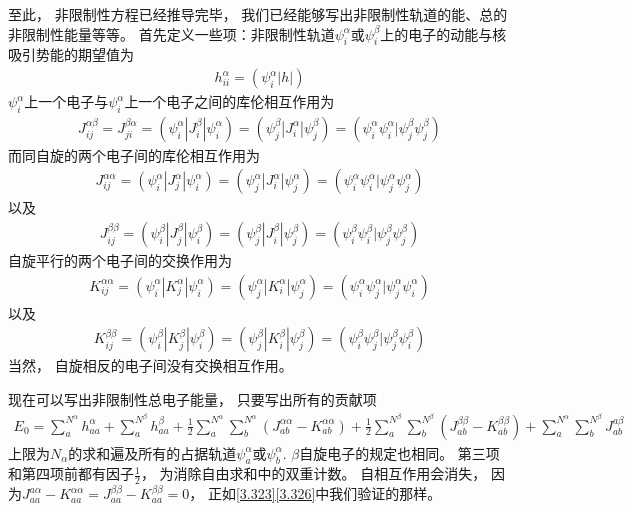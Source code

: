 至此，
非限制性\hft 方程已经推导完毕，
我们已经能够写出非限制性轨道的能、总的非限制性能量等等。
首先定义一些项：非限制性轨道$\psi_i^\alpha$或$\psi_i^\beta$上的电子的动能与核吸引势能的期望值为
\begin{align}\label{3.321}
	h_{ii}^\alpha = (\psi_i^\alpha|h|)
\end{align}
$\psi_i^\alpha$上一个电子与$\psi_i^\alpha$上一个电子之间的库伦相互作用为
\begin{align}\label{3.322}
	J_{ij}^{\alpha\beta} = J_{ji}^{\beta\alpha} = (\psi_i^\alpha|J_{i}^\beta|\psi_i^\alpha) = (\psi_j^\beta|J_{i}^\alpha|\psi_j^\beta) = (\psi_i^\alpha\psi_i^\alpha|\psi_j^\beta\psi_j^\beta)
\end{align}
而同自旋的两个电子间的库伦相互作用为
\begin{align}\label{3.323}
	J_{i j}^{\alpha \alpha}=(\psi_{i}^{\alpha}|J_{j}^{\alpha}| \psi_{i}^{\alpha})=(\psi_{j}^{\alpha}|J_{i}^{\alpha}| \psi_{j}^{\alpha})=(\psi_{i}^{\alpha} \psi_{i}^{\alpha} | \psi_{j}^{\alpha} \psi_{j}^{\alpha})
\end{align}
以及
\begin{align}\label{3.324}
	J_{i j}^{\beta \beta}=(\psi_{i}^{\beta}|J_{j}^{\beta}| \psi_{i}^{\beta})=(\psi_{j}^{\beta}|J_{i}^{\beta}| \psi_{j}^{\beta})=(\psi_{i}^{\beta} \psi_{i}^{\beta} | \psi_{j}^{\beta} \psi_{j}^{\beta})
\end{align}
自旋平行的两个电子间的交换作用为
\begin{align}\label{3.325}
	K_{i j}^{\alpha\alpha}=(\psi_{i}^{\alpha}|K_{j}^{\alpha}| \psi_{i}^{\alpha})=(\psi_{j}^{\alpha}|K_{i}^{\alpha}| \psi_{j}^{\alpha})=(\psi_{i}^{\alpha} \psi_{j}^{\alpha} | \psi_{j}^{\alpha} \psi_{i}^{\alpha})
\end{align}
以及
\begin{align}\label{3.326}
	K_{i j}^{\beta\beta}=(\psi_{i}^{\beta}|K_{j}^{\beta}| \psi_{i}^{\beta})=(\psi_{j}^{\beta}|K_{i}^{\beta}| \psi_{j}^{\beta})=(\psi_{i}^{\beta} \psi_{j}^{\beta} | \psi_{j}^{\beta} \psi_{i}^{\beta})
\end{align}
当然，
自旋相反的电子间没有交换相互作用。


现在可以写出非限制性总电子能量，
只要写出所有的贡献项
\begin{align}
	E_{0}=\sum_{a}^{N^{\alpha}} h_{a a}^{\alpha}+\sum_{a}^{N^{\beta}} h_{a a}^{\beta}+\frac{1}{2} \sum_{a}^{N^{\alpha}} \sum_{b}^{N^{\alpha}}\left(J_{a b}^{\alpha \alpha}-K_{a b}^{\alpha \alpha}\right)+\frac{1}{2} \sum_{a}^{N^{\beta}} \sum_{b}^{N^{\beta}}\left(J_{a b}^{\beta \beta}-K_{a b}^{\beta \beta}\right)+\sum_{a}^{N^{\alpha}} \sum_{b}^{N^{\beta}} J_{a b}^{a \beta}
\end{align}
上限为$N_\alpha$的求和遍及所有的占据轨道$\psi_a^\alpha$或$\psi_b^\alpha$. 
$\beta$自旋电子的规定也相同。 
第三项和第四项前都有因子$\frac{1}{2}$，
为消除自由求和中的双重计数。
自相互作用会消失，
因为$J_{a a}^{a \alpha}-K_{a a}^{\alpha \alpha}=J_{a a}^{\beta \beta}-K_{a a}^{\beta \beta}=0$，
正如\autoref{3.323}\autoref{3.326}中我们验证的那样。

